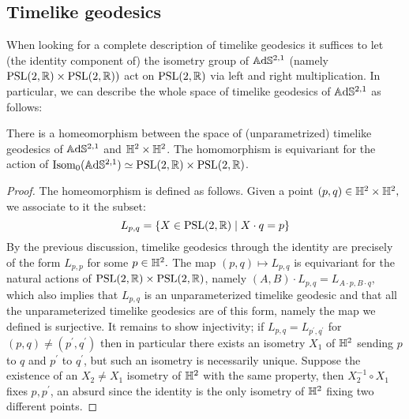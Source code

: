\subsection{Timelike geodesics}
When looking for a complete description of timelike geodesics it suffices to let (the identity component of) the isometry group of $\mathbb{A}\mathrm{d}\mathbb{S}^{2,1}$ (namely $\text{PSL}(2,\mathbb{R})\times\text{PSL}(2,\mathbb{R}))$ act on $\text{PSL}(2,\mathbb{R})$ via left and right multiplication. In particular, we can describe the whole space of timelike geodesics of $\mathbb{A}\mathrm{d}\mathbb{S}^{2,1}$ as follows: 

\begin{proposition}\label{352}
    There is a homeomorphism between the space of (unparametrized) timelike geodesics of $\mathbb{A}\mathrm{d}\mathbb{S}^{2,1}$ and $\mathbb{H}^2\times\mathbb{H}^2$. The homomorphism is equivariant for the action of $\text{Isom}_{0} (\mathbb{A}\mathrm{d}\mathbb{S}^{2,1})\simeq \text{PSL}(2,\mathbb{R})\times\text{PSL}(2,\mathbb{R})$.
\end{proposition}
\begin{proof}
    The homeomorphism is defined as follows. Given a point $(p,q)\in \mathbb{H}^2\times\mathbb{H}^2,$ we associate to it the subset: 
    \[
        L_{p,q}=\{X\in\text{PSL}(2,\mathbb{R})\;|\;X\cdot q=p\}
    \]
    By the previous discussion, timelike geodesics through the identity are precisely of the form $L_{p,p}$ for some $p\in\mathbb{H}^2.$ The map $(p,q)\mapsto L_{p,q}$ is equivariant for the natural actions of $\text{PSL}(2,\mathbb{R})\times \text{PSL}(2,\mathbb{R})$, namely $(A,B)\cdot L_{p,q}=L_{A\cdot p,B\cdot q},$ which also implies that $L_{p,q}$ is an unparameterized timelike geodesic and that all the unparameterized timelike geodesics are of this form, namely the map we defined is surjective. It remains to show injectivity; if $L_{p,q}=L_{p^{\prime} ,q^{\prime} }$ for $(p,q)\neq(p^{\prime},q^{\prime} )$ then in particular there exists an isometry $X_1$ of $\mathbb{H}^2$ sending $p$ to $q$ and $p^{\prime} $ to $q^{\prime}$, but such an isometry is necessarily unique. Suppose the existence of an $X_2\neq X_1$ isometry of $\mathbb{H}^2$ with the same property, then $X_2^{-1}\circ X_1$ fixes $p,p^{\prime}$, an absurd since the identity is the only isometry of $\mathbb{H}^2$ fixing two different points.
\end{proof}

